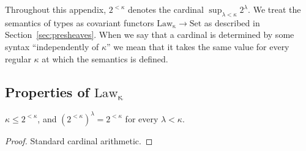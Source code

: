 \documentclass[acmsmall, screen, review, anonymous]{acmart}
\theoremstyle{definition}
\newcommand{\arr}{\rightarrow}
\newcommand{\setc}{\mathrm{Set}}
\newcommand{\lawc}{\mathrm{Law_{\kappa}}}
\begin{document}
Throughout this appendix, $2^{<\kappa}$ denotes the cardinal
$\sup_{\lambda < \kappa} 2^{\lambda}$. We treat the
semantics of types as covariant functors $\lawc \arr \setc$ as described
in Section~\ref{sec:presheaves}. When we say that a cardinal is
determined by some syntax ``independently of $\kappa$'' we mean that it
takes the same value for every regular $\kappa$ at which the semantics
is defined.

\subsection{Properties of $\lawc$}
\label{apdx:lawprops}

\begin{lemma}
\label{lemma:cardinal-arithmetic}
  $\kappa \le 2^{<\kappa}$, and $(2^{<\kappa})^{\lambda} = 2^{<\kappa}$
  for every $\lambda < \kappa$.
\end{lemma}
\begin{proof}
  Standard cardinal arithmetic.
\end{proof}
\end{document}
